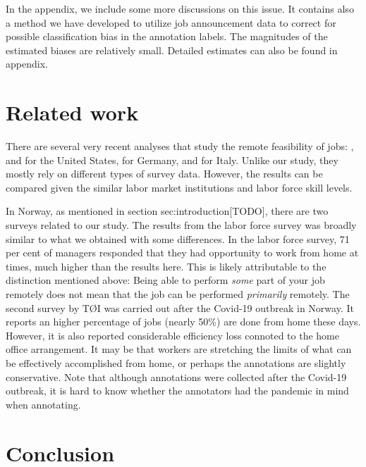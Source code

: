 \documentclass[11pt,]{article}
\begin{document}
In the appendix, we include some more discussions on this issue. It
contains also a method we have developed to utilize job announcement
data to correct for possible classification bias in the annotation
labels. The magnitudes of the estimated biases are relatively small.
Detailed estimates can also be found in appendix.

\hypertarget{related-work}{%
\section{Related work}\label{related-work}}

There are several very recent analyses that study the remote feasibility
of jobs: \citep{Dingel2020}, \citep{Brynjolfsson2020} and
\citep{Hensivk2020} for the United States, \citep{Alipour2020} for
Germany, and \citep{Barbieri2020} for Italy. Unlike our study, they
mostly rely on different types of survey data. However, the results can
be compared given the similar labor market institutions and labor force
skill levels.

In Norway, as mentioned in section sec:introduction{[}TODO{]}, there are
two surveys related to our study. The results from the labor force
survey was broadly similar to what we obtained with some differences. In
the labor force survey, 71 per cent of managers responded that they had
opportunity to work from home at times, much higher than the results
here. This is likely attributable to the distinction mentioned above:
Being able to perform \emph{some} part of your job remotely does not
mean that the job can be performed \emph{primarily} remotely. The second
survey by TØI was carried out after the Covid-19 outbreak in Norway. It
reports an higher percentage of jobs (nearly 50\%) are done from home
these days. However, it is also reported considerable efficiency loss
connoted to the home office arrangement. It may be that workers are
stretching the limits of what can be effectively accomplished from home,
or perhaps the annotations are slightly conservative. Note that although
annotations were collected after the Covid-19 outbreak, it is hard to
know whether the annotators had the pandemic in mind when annotating.

\hypertarget{conclusion}{%
\section{Conclusion}\label{conclusion}}
\end{document}
